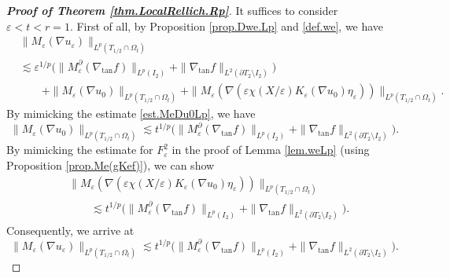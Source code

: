 \documentclass[reqno,12pt]{amsart} %
\theoremstyle{definition}
\theoremstyle{remark}
\numberwithin{equation}{section}
\newcommand{\e}{\varepsilon}
\begin{document}
\begin{proof}[\textbf{Proof of Theorem \ref{thm.LocalRellich.Rp}}]
    It suffices to consider $\e < t < r = 1$. First of all, by Proposition \ref{prop.Dwe.Lp} and \eqref{def.we}, we have
    \begin{equation}
    \begin{aligned}
        &\| M_\e(\nabla u_\e) \|_{L^p(T_{1/2} \cap \Omega_t)} \\
        & \lesssim \e^{1/p} \big( \| M_\e^\partial(\nabla_{\tan} f) \|_{L^p(I_2)} + \| \nabla_{\tan} f \|_{L^2(\partial T_2 \setminus I_2)} \big) \\
        & \qquad + \| M_\e(\nabla u_0) \|_{L^p(T_{1/2} \cap \Omega_t)} +  \| M_\e(\nabla ( \e \chi(X/\e) K_\e(\nabla u_0) \eta_\e ) )\|_{L^p(T_{1/2}\cap \Omega_t)}.
        \end{aligned}
    \end{equation}
    By mimicking the estimate \eqref{est.MeDu0Lp}, we have
    \begin{equation}
        \| M_\e(\nabla u_0) \|_{L^p(T_{1/2} \cap \Omega_t)} \lesssim t^{1/p} \big( \| M_\e^\partial(\nabla_{\tan} f) \|_{L^p(I_2)} + \| \nabla_{\tan} f \|_{L^2(\partial T_2 \setminus I_2)} \big).
    \end{equation}
    By mimicking the estimate for $F_\e^2$ in the proof of Lemma \ref{lem.weLp} (using Proposition \ref{prop.Me(gKef)}), we can show
    \begin{equation}
    \begin{aligned}
        & \| M_\e(\nabla ( \e \chi(X/\e) K_\e(\nabla u_0) \eta_\e ) )\|_{L^p(T_{1/2}\cap \Omega_t)} \\
        & \qquad \lesssim t^{1/p} \big( \| M_\e^\partial(\nabla_{\tan} f) \|_{L^p(I_2)} + \| \nabla_{\tan} f \|_{L^2(\partial T_2 \setminus I_2)} \big).
    \end{aligned}
    \end{equation}
    Consequently, we arrive at
    \begin{equation}\label{est.MeDue.Ot}
        \| M_\e(\nabla u_\e) \|_{L^p(T_{1/2} \cap \Omega_t)} \lesssim t^{1/p} \big( \| M_\e^\partial(\nabla_{\tan} f) \|_{L^p(I_2)} + \| \nabla_{\tan} f \|_{L^2(\partial T_2 \setminus I_2)} \big).
    \end{equation}


\end{proof}
\end{document}
